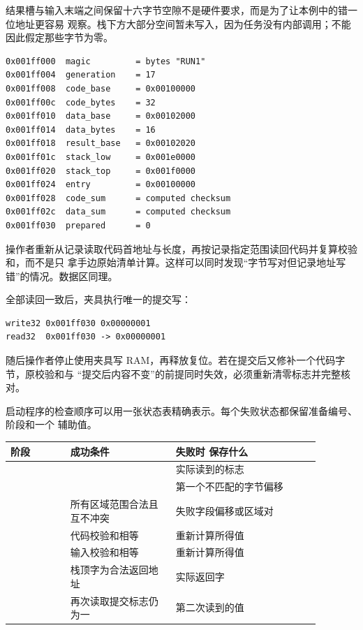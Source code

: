 结果槽与输入末端之间保留十六字节空隙不是硬件要求，而是为了让本例中的错一位地址更容易
观察。栈下方大部分空间暂未写入，因为任务没有内部调用；不能因此假定那些字节为零。


\begin{lstlisting}
0x001ff000  magic         = bytes "RUN1"
0x001ff004  generation    = 17
0x001ff008  code_base     = 0x00100000
0x001ff00c  code_bytes    = 32
0x001ff010  data_base     = 0x00102000
0x001ff014  data_bytes    = 16
0x001ff018  result_base   = 0x00102020
0x001ff01c  stack_low     = 0x001e0000
0x001ff020  stack_top     = 0x001f0000
0x001ff024  entry         = 0x00100000
0x001ff028  code_sum      = computed checksum
0x001ff02c  data_sum      = computed checksum
0x001ff030  prepared      = 0
\end{lstlisting}

操作者重新从记录读取代码首地址与长度，再按记录指定范围读回代码并复算校验和，而不是只
拿手边原始清单计算。这样可以同时发现“字节写对但记录地址写错”的情况。数据区同理。


全部读回一致后，夹具执行唯一的提交写：

\begin{lstlisting}
write32 0x001ff030 0x00000001
read32  0x001ff030 -> 0x00000001
\end{lstlisting}

随后操作者停止使用夹具写 RAM，再释放复位。若在提交后又修补一个代码字节，原校验和与
“提交后内容不变”的前提同时失效，必须重新清零标志并完整核对。


启动程序的检查顺序可以用一张状态表精确表示。每个失败状态都保留准备编号、阶段和一个
辅助值。

\begin{longtable}{|L{0.17\linewidth}|L{0.30\linewidth}|L{0.41\linewidth}|}
\hline
{}
阶段 & 成功条件 & 失败时  保存什么 \\ \hline
{} &  & 实际读到的标志 \\ \hline
{} &  & 第一个不匹配的字节偏移 \\ \hline
{} & 所有区域范围合法且互不冲突 & 失败字段偏移或区域对 \\ \hline
{} & 代码校验和相等 & 重新计算所得值 \\ \hline
{} & 输入校验和相等 & 重新计算所得值 \\ \hline
{} & 栈顶字为合法返回地址 & 实际返回字 \\ \hline
{} & 再次读取提交标志仍为一 & 第二次读到的值 \\ \hline
\end{longtable}


